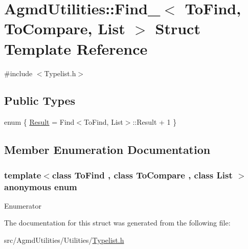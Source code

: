 \hypertarget{struct_agmd_utilities_1_1_find__}{\section{Agmd\+Utilities\+:\+:Find\+\_\+$<$ To\+Find, To\+Compare, List $>$ Struct Template Reference}
\label{struct_agmd_utilities_1_1_find__}
}


{\ttfamily \#include $<$Typelist.\+h$>$}

\subsection*{Public Types}
\begin{DoxyCompactItemize}
\item 
enum \{ \hyperlink{struct_agmd_utilities_1_1_find___a475f4cd7a0f3e10992032cf1eb6522aaa6d5c3ba1cb2264ac68b84d9df90c32e0}{Result} = Find$<$To\+Find, List$>$\+:\+:Result + 1
 \}
\end{DoxyCompactItemize}


\subsection{Member Enumeration Documentation}
\hypertarget{struct_agmd_utilities_1_1_find___a475f4cd7a0f3e10992032cf1eb6522aa}{\subsubsection[{anonymous enum}]{\setlength{\rightskip}{0pt plus 5cm}template$<$class To\+Find , class To\+Compare , class List $>$ anonymous enum}}\label{struct_agmd_utilities_1_1_find___a475f4cd7a0f3e10992032cf1eb6522aa}
\begin{Desc}
\item[Enumerator]\par
\begin{description}
\item[{\em 
\hypertarget{struct_agmd_utilities_1_1_find___a475f4cd7a0f3e10992032cf1eb6522aaa6d5c3ba1cb2264ac68b84d9df90c32e0}{Result}\label{struct_agmd_utilities_1_1_find___a475f4cd7a0f3e10992032cf1eb6522aaa6d5c3ba1cb2264ac68b84d9df90c32e0}
}]\end{description}
\end{Desc}


The documentation for this struct was generated from the following file\+:\begin{DoxyCompactItemize}
\item 
src/\+Agmd\+Utilities/\+Utilities/\hyperlink{_typelist_8h}{Typelist.\+h}\end{DoxyCompactItemize}
